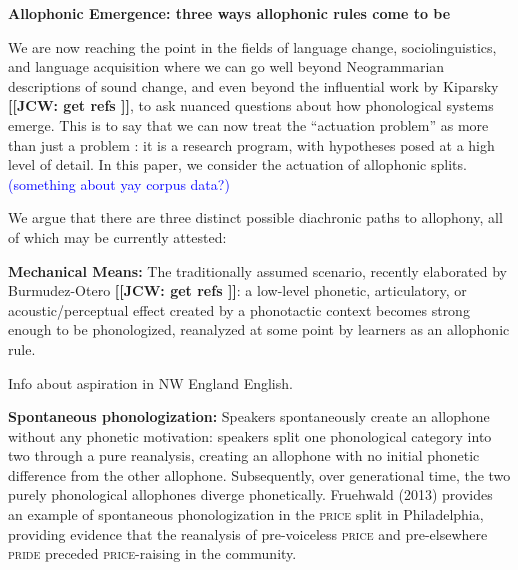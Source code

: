\documentclass[a4paper,aps,prl,12pt,tightenlines,superscriptaddress]{revtex4}
\title{}
\newcommand{\noteme}[1]{\noindent \textbf{[[JCW:  #1 ]]}}
\begin{document}
\begin{center} \textbf{Allophonic Emergence: three ways allophonic rules come to be} 
 \end{center}



We are now reaching the point in the fields of language change, sociolinguistics, and language acquisition where we can go well beyond Neogrammarian descriptions of sound change, and even beyond the influential work by Kiparsky \noteme{get refs}, to ask nuanced questions about how phonological systems emerge. This is to say that we can now treat the ``actuation problem'' as more than just a problem \citep{wlh1968}: it is a research program, with hypotheses posed at a high level of detail. In this paper, we consider the actuation of allophonic splits. \textcolor{blue}{(something about yay corpus data?)}

We argue that there are three distinct possible diachronic paths to allophony, all of which may be currently attested:

\textbf{Mechanical Means:} The traditionally assumed scenario, recently elaborated by Burmudez-Otero \noteme{get refs}: a low-level phonetic, articulatory, or acoustic/perceptual effect created by a phonotactic context becomes strong enough to be phonologized, reanalyzed at some point by learners as an allophonic rule. 

Info about aspiration in NW England English. 

\textbf{Spontaneous phonologization:} Speakers spontaneously create an allophone without any phonetic motivation: speakers split one phonological category into two through a pure reanalysis, creating an allophone with no initial phonetic difference from the other allophone. Subsequently, over generational time, the two purely phonological allophones diverge phonetically. Fruehwald (2013) provides an example of spontaneous phonologization in the \textsc{price} split in Philadelphia, providing evidence that the reanalysis of pre-voiceless \textsc{price} and pre-elsewhere \textsc{pride} preceded \textsc{price}-raising in the community.
\end{document}
